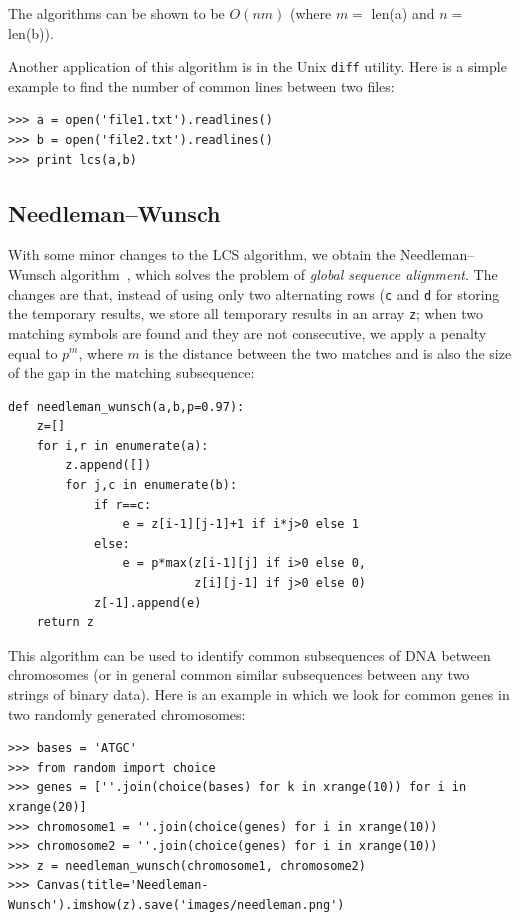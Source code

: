 \documentclass[justified,sixbynine]{tufte-book}
\def\ft{\small\tt}
\theoremstyle{plain}%
\theoremstyle{definition}
\theoremstyle{remark}
\begin{document}
\begin{fullwidth}
The algorithms can be shown to be $O(nm)$ (where $m=$ len(a) and $n=$ len(b)).

Another application of this algorithm is in the Unix {\ft diff} utility. Here is a simple example to find the number of common lines between two files:

\begin{lstlisting}
>>> a = open('file1.txt').readlines()
>>> b = open('file2.txt').readlines()
>>> print lcs(a,b)
\end{lstlisting}

\subsection{Needleman--Wunsch}


With some minor changes to the LCS algorithm, we obtain the Needleman--Wunsch algorithm~\cite{needleman}, which solves the problem of {\it global sequence alignment}. The changes are that, instead of using only two alternating rows ({\ft c} and {\ft d} for storing the temporary results, we store all temporary results in an array {\ft z}; when two matching symbols are found and they are not consecutive, we apply a penalty equal to $p^m$, where $m$ is the distance between the two matches and is also the size of the gap in the matching subsequence:


\begin{lstlisting}[caption={in file: {\ft nlib.py}}]
def needleman_wunsch(a,b,p=0.97):
    z=[]
    for i,r in enumerate(a):
        z.append([])
        for j,c in enumerate(b):
            if r==c:
                e = z[i-1][j-1]+1 if i*j>0 else 1
            else:
                e = p*max(z[i-1][j] if i>0 else 0,
                          z[i][j-1] if j>0 else 0)
            z[-1].append(e)
    return z
\end{lstlisting}

This algorithm can be used to identify common subsequences of DNA between chromosomes (or in general common similar subsequences between any two strings of binary data). Here is an example in which we look for common genes in two randomly generated chromosomes:

\begin{lstlisting}[caption={in file: {\ft nlib.py}}]
>>> bases = 'ATGC'
>>> from random import choice
>>> genes = [''.join(choice(bases) for k in xrange(10)) for i in xrange(20)]
>>> chromosome1 = ''.join(choice(genes) for i in xrange(10))
>>> chromosome2 = ''.join(choice(genes) for i in xrange(10))
>>> z = needleman_wunsch(chromosome1, chromosome2)
>>> Canvas(title='Needleman-Wunsch').imshow(z).save('images/needleman.png')
\end{lstlisting}


\end{fullwidth}
\end{document}
